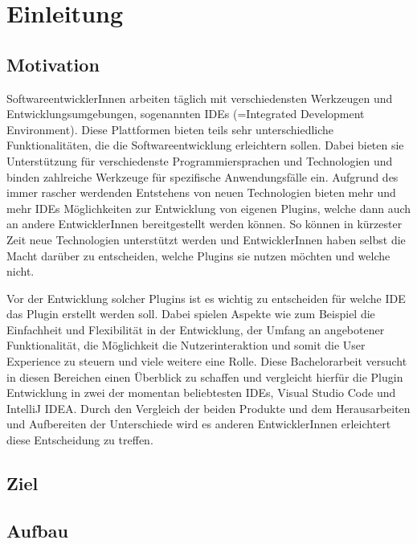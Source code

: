 \chapter{Einleitung}
\label{cha:Einleitung}


\section{Motivation}
\label{sec:Motivation}

SoftwareentwicklerInnen arbeiten täglich mit verschiedensten 
Werkzeugen und Entwicklungsumgebungen, sogenannten IDEs 
(=Integrated Development Environment). Diese Plattformen 
bieten teils sehr unterschiedliche Funktionalitäten, die 
die Softwareentwicklung erleichtern sollen. Dabei bieten 
sie Unterstützung für verschiedenste Programmiersprachen 
und Technologien und binden zahlreiche Werkzeuge für 
spezifische Anwendungsfälle ein. Aufgrund des immer rascher
werdenden Entstehens von neuen Technologien bieten mehr 
und mehr IDEs Möglichkeiten zur Entwicklung von eigenen 
Plugins, welche dann auch an andere EntwicklerInnen 
bereitgestellt werden können. So können in kürzester 
Zeit neue Technologien unterstützt werden und 
EntwicklerInnen haben selbst die Macht darüber zu 
entscheiden, welche Plugins sie nutzen möchten und 
welche nicht.

Vor der Entwicklung solcher Plugins ist es wichtig 
zu entscheiden für welche IDE das Plugin erstellt 
werden soll. Dabei spielen Aspekte wie zum Beispiel 
die Einfachheit und Flexibilität in der Entwicklung, 
der Umfang an angebotener Funktionalität, die Möglichkeit %
die Nutzerinteraktion und somit die User Experience 
zu steuern und viele weitere eine Rolle. 
Diese Bachelorarbeit versucht in diesen Bereichen 
einen Überblick zu schaffen und vergleicht hierfür 
die Plugin Entwicklung in zwei der momentan beliebtesten 
IDEs, Visual Studio Code und IntelliJ IDEA. Durch den 
Vergleich der beiden Produkte und dem Herausarbeiten 
und Aufbereiten der Unterschiede wird es anderen 
EntwicklerInnen erleichtert diese Entscheidung zu treffen.


\section{Ziel}
\label{sec:Ziel}

\section{Aufbau}
\label{sec:Aufbau}